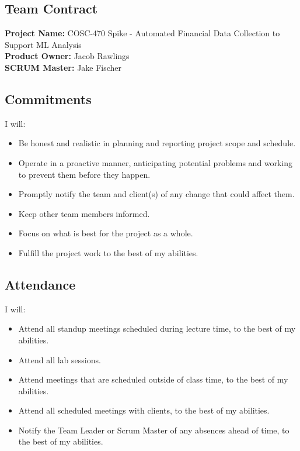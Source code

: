 \begin{appendices}
\chapter{Team Contract}
\noindent\textbf{Project Name:} COSC-470 Spike - Automated Financial Data Collection to Support ML Analysis \\
\textbf{Product Owner:} Jacob Rawlings \\
\textbf{SCRUM Master:} Jake Fischer

\section{Commitments}
I will:
\begin{itemize}
    \item Be honest and realistic in planning and reporting project scope and schedule.
    \item Operate in a proactive manner, anticipating potential problems and working to prevent them before they happen.
    \item Promptly notify the team and client(s) of any change that could affect them.
    \item Keep other team members informed.
    \item Focus on what is best for the project as a whole.
    \item Fulfill the project work to the best of my abilities.
\end{itemize}

\section{Attendance}
I will:
\begin{itemize}
    \item Attend all standup meetings scheduled during lecture time, to the best of my abilities.
    \item Attend all lab sessions.
    \item Attend meetings that are scheduled outside of class time, to the best of my abilities.
    \item Attend all scheduled meetings with clients, to the best of my abilities.
    \item Notify the Team Leader or Scrum Master of any absences ahead of time, to the best of my abilities.
\end{itemize}


\end{appendices}

